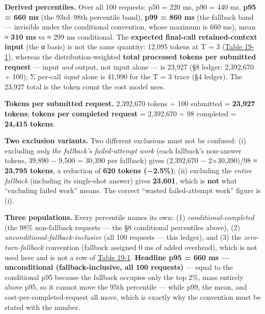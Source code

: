 \textbf{Derived percentiles.} Over all 100 requests: p50 = 220 ms, p90 =
440 ms, \textbf{p95 = 660 ms} (the 93rd--98th percentile band),
\textbf{p99 = 860 ms} (the fallback band --- invisible under the
conditional convention, whose maximum is 660 ms), mean ≈ \textbf{310 ms}
vs ≈ 299 ms conditional. The \textbf{expected final-call
retained-context input} (the α basis) is not the same quantity: 12,095
tokens at T = 3 (\hyperref[tab:19.1]{Table 19-1}), whereas the distribution-weighted
\textbf{total processed tokens per submitted request} --- input
\emph{and} output, not input alone --- is 23,927 (§8 ledger: 2,392,670 ÷
100); Σ per-call \emph{input} alone is 41,990 for the T = 3 trace (§4
ledger). The 23,927 total is the token count the cost model uses.

\textbf{Tokens per submitted request.} 2,392,670 tokens ÷ 100 submitted
= \textbf{23,927 tokens}; \textbf{tokens per completed request} =
2,392,670 ÷ 98 completed = \textbf{24,415 tokens}.

\textbf{Two exclusion variants.} Two different exclusions must not be
confused: (i) excluding \emph{only the fallback's failed-attempt work}
(each fallback's non-answer tokens, 39,890 − 9,500 = 30,390 per
fallback) gives (2,392,670 − 2×30,390)/98 ≈ \textbf{23,795 tokens}, a
reduction of \textbf{620 tokens (−2.5\%)}; (ii) excluding the
\emph{entire fallback} (including its single-shot answer) gives
\textbf{23,601}, which is \textbf{not} what ``excluding failed work''
means. The correct ``wasted failed-attempt work'' figure is (i).

\textbf{Three populations.} Every percentile names its own: (1)
\emph{conditional-completed} (the 98\% non-fallback requests --- the §8
conditional percentiles above), (2)
\emph{unconditional-fallback-inclusive} (all 100 requests --- this
ledger), and (3) the \emph{zero-turn-fallback} convention (fallback
assigned 0 ms of added overhead), which is not used here and is not a
row of \hyperref[tab:19.1]{Table 19-1}. \textbf{Headline p95 = 660 ms --- unconditional
(fallback-inclusive, all 100 requests)} --- equal to the conditional p95
because the fallback occupies only the top 2\%, mass entirely above p95,
so it cannot move the 95th percentile --- while p99, the mean, and
cost-per-completed-request all move, which is exactly why the convention
must be stated with the number.

